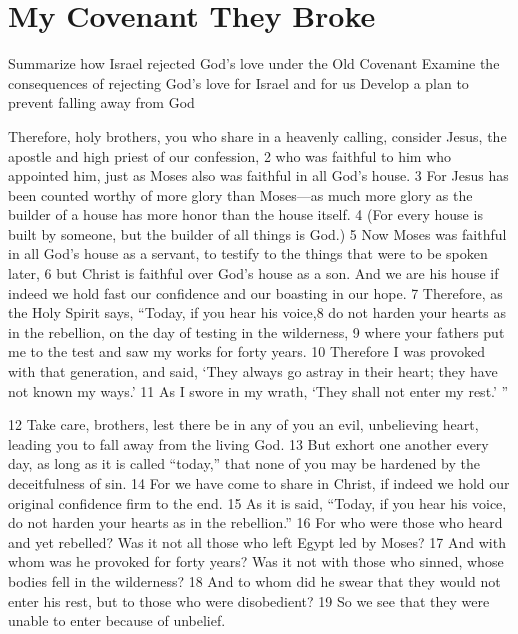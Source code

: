 \chapter{My Covenant They Broke}

\begin{goals}
\goal Summarize how Israel rejected God's love under the Old Covenant
\goal Examine the consequences of rejecting God's love for Israel and for us
\goal Develop a plan to prevent falling away from God
\end{goals}

\begin{bible}


Therefore, holy brothers, you who share in a heavenly calling, consider Jesus, the apostle and high priest of our confession, 2 who was faithful to him who appointed him, just as Moses also was faithful in all God's house. 3 For Jesus has been counted worthy of more glory than Moses—as much more glory as the builder of a house has more honor than the house itself. 4 (For every house is built by someone, but the builder of all things is God.) 5 Now Moses was faithful in all God's house as a servant, to testify to the things that were to be spoken later, 6 but Christ is faithful over God's house as a son. And we are his house if indeed we hold fast our confidence and our boasting in our hope. 7 Therefore, as the Holy Spirit says, ``Today, if you hear his voice,8 do not harden your hearts as in the rebellion, on the day of testing in the wilderness, 9 where your fathers put me to the test and saw my works for forty years. 10 Therefore I was provoked with that generation, and said, `They always go astray in their heart; they have not known my ways.' 11 As I swore in my wrath, `They shall not enter my rest.' ''

12 Take care, brothers, lest there be in any of you an evil, unbelieving heart, leading you to fall away from the living God. 13 But exhort one another every day, as long as it is called ``today,'' that none of you may be hardened by the deceitfulness of sin. 14 For we have come to share in Christ, if indeed we hold our original confidence firm to the end. 15 As it is said, ``Today, if you hear his voice, do not harden your hearts as in the rebellion.'' 16 For who were those who heard and yet rebelled? Was it not all those who left Egypt led by Moses? 17 And with whom was he provoked for forty years? Was it not with those who sinned, whose bodies fell in the wilderness? 18 And to whom did he swear that they would not enter his rest, but to those who were disobedient? 19 So we see that they were unable to enter because of unbelief. 


\end{bible}
